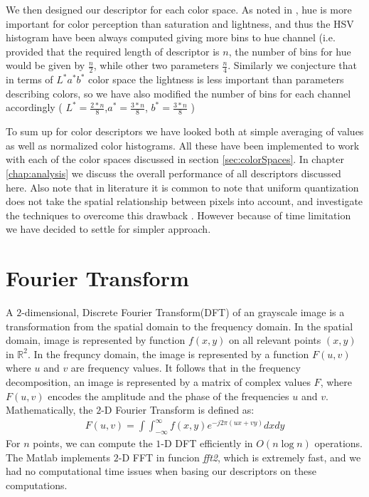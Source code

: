 \documentclass{report}
\begin{document}
We then designed our descriptor for each color space. As noted in \cite{HSV_non_uniform}, hue is more important for color perception than saturation and lightness, and thus the HSV histogram have been always computed giving more bins to hue channel (i.e. provided that the required length of descriptor is $n$, the number of bins for hue would be given by $\frac{n}{2}$, while other two parameters $\frac{n}{4}$. Similarly we conjecture that in terms of $L^*a^*b^*$ color space the lightness is less important than parameters describing colors, so we have also modified the number of bins for each channel accordingly ( $L^* = \frac{2*n}{8}$,$ a^* = \frac{3*n}{8}$, $b^* = \frac{3*n}{8}$ )

To sum up for color descriptors we have looked both at simple averaging of values as well as normalized color histograms. All these have been implemented to work with each of the color spaces discussed in section \ref{sec:colorSpaces}. In chapter \ref{chap:analysis} we discuss the overall performance of all descriptors discussed here. Also note that in literature it is common to note that uniform quantization does not take the spatial relationship between pixels into account, and investigate the techniques to overcome this drawback \cite{GaussQunatization}. However because of time limitation we have decided to settle for simpler approach.

\section{Fourier Transform} 
\label{sec:FFT} 
A $2$-dimensional, Discrete Fourier Transform(DFT) of an grayscale image is a transformation from the spatial domain to the frequency domain. In the spatial domain, image is represented by function $f(x,y)$ on all relevant points $(x,y)$ in  $\mathbb{R}^2$. In the frequncy domain, the image is represented by a function $F(u,v)$ where $u$ and $v$ are frequency values. It follows that in the frequency decomposition, an image is represented by a matrix of complex values $F$, where $F(u,v)$ encodes the amplitude and the phase of the frequencies $u$ and $v$. Mathematically, the $2$-D Fourier Transform is defined as:
\begin{eqnarray}
F(u,v) = \int \int ^{\infty}_{-\infty} f(x,y)e^{-j2\pi (ux+vy)}dx dy
\end{eqnarray}
For $n$ points, we can compute the $1$-D DFT efficiently in $O(n\log{n})$ operations. The Matlab implements $2$-D FFT  in funcion \textit{fft2}, which is extremely  fast, and we had no computational time issues when basing our descriptors on these computations.
\end{document}
